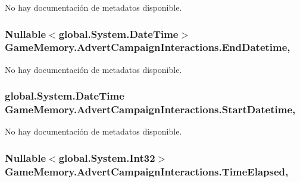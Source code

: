 No hay documentación de metadatos disponible. 

\hypertarget{class_game_memory_1_1_advert_campaign_interactions_ab6ed1c939196344d74d443aca721c5e1}{
\subsubsection[{End\-Datetime}]{\setlength{\rightskip}{0pt plus 5cm}Nullable$<$global.\-System.\-Date\-Time$>$ Game\-Memory.\-Advert\-Campaign\-Interactions.\-End\-Datetime\hspace{0.3cm}{\ttfamily [get]}, {\ttfamily [set]}}}\label{class_game_memory_1_1_advert_campaign_interactions_ab6ed1c939196344d74d443aca721c5e1}


No hay documentación de metadatos disponible. 

\hypertarget{class_game_memory_1_1_advert_campaign_interactions_ab45778d100a4712092c7e4596a0f202b}{
\subsubsection[{Start\-Datetime}]{\setlength{\rightskip}{0pt plus 5cm}global.\-System.\-Date\-Time Game\-Memory.\-Advert\-Campaign\-Interactions.\-Start\-Datetime\hspace{0.3cm}{\ttfamily [get]}, {\ttfamily [set]}}}\label{class_game_memory_1_1_advert_campaign_interactions_ab45778d100a4712092c7e4596a0f202b}


No hay documentación de metadatos disponible. 

\hypertarget{class_game_memory_1_1_advert_campaign_interactions_a7bd92a415be6927712becae96824e73d}{
\subsubsection[{Time\-Elapsed}]{\setlength{\rightskip}{0pt plus 5cm}Nullable$<$global.\-System.\-Int32$>$ Game\-Memory.\-Advert\-Campaign\-Interactions.\-Time\-Elapsed\hspace{0.3cm}{\ttfamily [get]}, {\ttfamily [set]}}}\label{class_game_memory_1_1_advert_campaign_interactions_a7bd92a415be6927712becae96824e73d}


